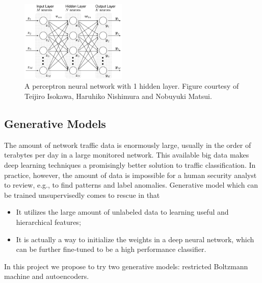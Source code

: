 \begin{figure}[h]
    \centering
    \includegraphics[width=0.45\textwidth]{figures/multilayer_perceptron.png}
    \caption{A perceptron neural network with 1 hidden layer.
        Figure courtesy of Teijiro Isokawa, Haruhiko Nishimura and Nobuyuki Matsui.}
    \label{Fig:MLPArchitecture}
\end{figure}

\subsection{Generative Models}
The amount of network traffic data is enormously large, usually in the order of terabytes
per day in a large monitored network.
This available big data makes deep learning techniques a promisingly better solution
to traffic classification.
In practice, however, the amount of data is impossible for a human security analyst to review,
e.g., to find patterns and label anomalies.
Generative model which can be trained unsupervisedly comes to rescue in that
\begin{itemize}
    \item It utilizes the large amount of unlabeled data to learning useful and hierarchical features;
    \item It is actually a way to initialize the weights in a deep neural network, which can be
        further fine-tuned to be a high performance classifier.
\end{itemize}
In this project we propose to try two generative models: restricted Boltzmann machine and autoencoders.

